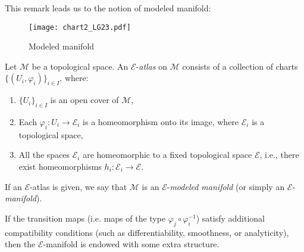 

\vspace{3pt}
This remark leads us to the notion of modeled manifold:
\begin{figure}[h]
\texttt{[image: chart2\_LG23.pdf]}
\caption{Modeled manifold }\label{F:Chart2}
\end{figure}

\begin{definition}

\noindent
Let \(\mathcal{M}\) be a topological space. An \(\mathcal{E}\)-\textit{atlas} on \(\mathcal{M}\) consists of a collection of charts \(\{(U_i, \varphi_i)\}_{i \in I}\), where:

\begin{enumerate}
    \item \(\{U_i\}_{i \in I}\) is an open cover of \(\mathcal{M}\),
    \item Each \(\varphi_i: U_i \to \mathcal{E}_i\) is a homeomorphism onto its image, where \(\mathcal{E}_i\) is a topological space,
    \item All the spaces \(\mathcal{E}_i\) are homeomorphic to a fixed topological space \(\mathcal{E}\), i.e., there exist homeomorphisms \(h_i: \mathcal{E}_i \to \mathcal{E}\).
\end{enumerate}

If an \(\mathcal{E}\)-atlas is given, we say that \(\mathcal{M}\) is an \(\mathcal{E}\)-\textit{modeled manifold} (or simply an \(\mathcal{E}\)-\textit{manifold}).


\end{definition}

\noindent

If the transition maps (i.e. maps of the type \(\varphi_j \circ \varphi_i^{-1}\)) satisfy additional compatibility conditions (such as differentiability, smoothness, or analyticity), then  the \(\mathcal{E}\)-manifold is endowed with some extra structure.


